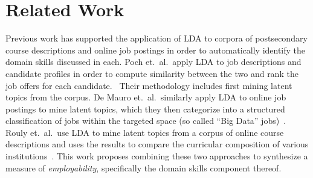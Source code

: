 \section{Related Work}

Previous work has supported the application of LDA to corpora of postsecondary course descriptions and online job postings in order to automatically identify the domain skills discussed in each.
Poch et.\ al.\ apply LDA to job descriptions and candidate profiles in order to compute similarity between the two and rank the job offers for each candidate.~\cite{poch2014}
Their methodology includes first mining latent topics from the corpus.
De Mauro et.\ al.\ similarly apply LDA to online job postings to mine latent topics, which they then categorize into a structured classification of jobs within the targeted space (so called ``Big Data'' jobs)~\cite{de2018}.
Rouly et.\ al.\ use LDA to mine latent topics from a corpus of online course descriptions and uses the results to compare the curricular composition of various institutions~\cite{rouly2015}.
This work proposes combining these two approaches to synthesize a measure of \textit{employability}, specifically the domain skills component thereof.

